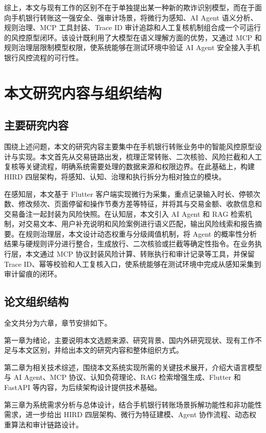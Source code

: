 \documentclass{xduugthesis}
\begin{document}
综上，本文与现有工作的区别不在于单独提出某一种新的欺诈识别模型，而在于面向手机银行转账这一强安全、强审计场景，将微行为感知、AI Agent 语义分析、规则治理、MCP 工具封装、Trace ID 审计追踪和人工复核机制组合成一个可运行的风控原型闭环。该设计既利用了大模型在语义理解方面的优势，又通过 MCP 和规则治理层限制模型权限，使系统能够在测试环境中验证 AI Agent 安全接入手机银行风控流程的可行性。

\section{本文研究内容与组织结构}

\subsection{主要研究内容}

围绕上述问题，本文的研究内容主要集中在手机银行转账业务中的智能风控原型设计与实现。本文首先从交易链路出发，梳理正常转账、二次核验、风险拦截和人工复核等关键流程，明确系统需要处理的数据来源和权限边界。在此基础上，构建 HIRD 四层架构，将感知、认知、治理和执行拆分为相对独立的模块\cite{agnihotram2025agentic}。

在感知层，本文基于 Flutter 客户端实现微行为采集，重点记录输入时长、停顿次数、修改频次、页面停留和操作节奏方差等特征，并将其与交易金额、收款信息和交易备注一起封装为风险快照。在认知层，本文引入 AI Agent 和 RAG 检索机制，对交易文本、用户补充说明和风险案例进行语义匹配，输出风险线索和报告摘要。在规则治理层，本文设计动态权重与分级阈值机制，将 Agent 的概率性分析结果与硬规则评分进行整合，生成放行、二次核验或拦截等确定性指令。在业务执行层，本文通过 MCP 协议封装风险计算、转账执行和审计记录等工具，并保留 Trace ID、幂等校验和人工复核入口，使系统能够在测试环境中完成从感知采集到审计留痕的闭环。

\subsection{论文组织结构}

全文共分为六章，章节安排如下。

第一章为绪论，主要说明本文选题来源、研究背景、国内外研究现状、现有工作不足与本文区别，并给出本文的研究内容和整体组织方式。

第二章为相关技术综述，围绕本文系统实现所需的关键技术展开，介绍大语言模型与 AI Agent、MCP 协议、认知负荷理论、RAG 检索增强生成、Flutter 和 FastAPI 等内容，为后续架构设计提供技术基础\cite{sommerville2016software,pressman2019software}。

第三章为系统需求分析与总体设计，结合手机银行转账场景拆解功能性和非功能性需求，进一步给出 HIRD 四层架构、微行为特征建模、Agent 协作流程、动态权重算法和审计链路设计。
\end{document}
